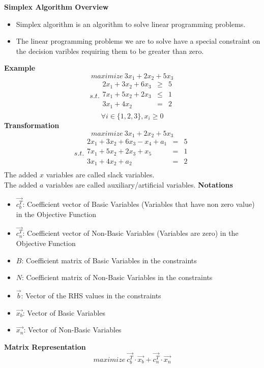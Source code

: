 \documentclass[landscape,letterpaper,pdftex]{slides}
\begin{document}
	\large{\textbf{Simplex Algorithm Overview}}
	\begin{itemize}
		\item
		Simplex algorithm is an algorithm to solve linear programming problems.
		\item
		The linear programming problems we are to solve have a special constraint on the decision varibles requiring them to be greater than zero.
	\end{itemize}
	\newpage
	\large{\textbf{Example}}
	\[maximize\ 3x_1 + 2x_2 + 5x_3\]
	\[s.t.\begin{array}{lcl}
		2x_1 + 3x_2 + 6x_3 &\geqslant &5\\
		7x_1 + 5x_2 + 2x_3 &\leqslant &1\\
		3x_1 + 4x_2        &=         &2\\
	\end{array}\]
	\[\forall i \in \{1, 2, 3\}, x_i \geqslant 0\]
	\newpage
	\large{\textbf{Transformation}}
	\[maximize\ 3x_1 + 2x_2 + 5x_3\]
	\[s.t.\begin{array}{lcl}
	2x_1 + 3x_2 + 6x_3 - x_4 + a_1 &= &5\\
	7x_1 + 5x_2 + 2x_3 + x_5       &= &1\\
	3x_1 + 4x_2 + a_2              &= &2\\
	\end{array}\]
	The added $x$ variables are called slack variables.\\
	The added $a$ variables are called auxiliary/artificial variables.
	\newpage
	\large{\textbf{Notations}}
	\begin{itemize}
		\item
		$\vec{c_{b}^{T}}$: Coefficient vector of Basic Variables (Variables that have non zero value) in the Objective Function
		\item
		$\vec{c_{n}^{T}}$: Coefficient vector of Non-Basic Variables (Variables are zero) in the Objective Function
		\item
		$B$: Coefficient matrix of Basic Variables in the constraints 
		\item
		$N$: Coefficient matrix of Non-Basic Variables in the constraints
		\item
		$\vec{b}$: Vector of the RHS values in the constraints
		\item
		$\vec{x_b}$: Vector of Basic Variables
		\item
		$\vec{x_n}$: Vector of Non-Basic Variables
	\end{itemize}
	\newpage
	\large{\textbf{Matrix Representation}}
	\[maximize\ \vec{c_{b}^{T}}\cdot \vec{x_b} + \vec{c_{n}^{T}}\cdot \vec{x_n}\]
\end{document}

